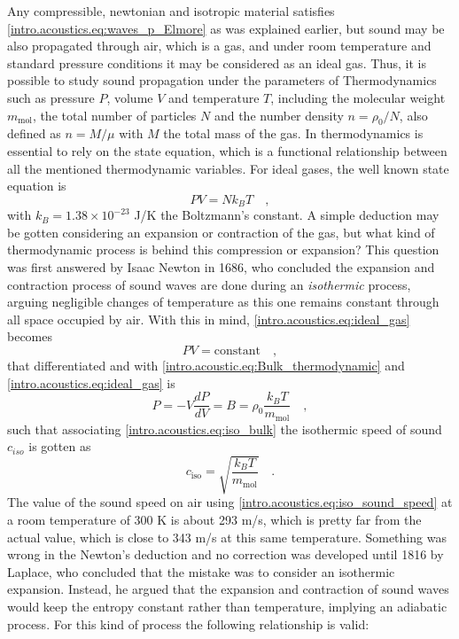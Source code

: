 Any compressible, newtonian and isotropic material satisfies \ref{intro.acoustics.eq:waves_p_Elmore} as was explained earlier, but sound may be also propagated through air, which is a gas, and under room temperature and standard pressure conditions it may be considered as an ideal gas. Thus, it is possible to study sound propagation under the parameters of Thermodynamics such as pressure $P$, volume $V$ and temperature $T$, including the molecular weight $m_{\text{mol}}$, the total number of particles $N$ and the number density $n = \rho_0/N$, also defined as $n = M/\mu$ with $M$ the total mass of the gas. In thermodynamics is essential to rely on the state equation, which is a functional relationship between all the mentioned thermodynamic variables. For ideal gases, the well known state equation is
\begin{equation}\label{intro.acoustics.eq:ideal_gas}
    PV = Nk_BT\quad,
\end{equation}
with $k_B = 1.38\times10^{-23}$ J/K the Boltzmann's constant. A simple deduction may be gotten considering an expansion or contraction of the gas, but what kind of thermodynamic process is behind this compression or expansion? This question was first answered by Isaac Newton in 1686, who concluded the expansion and contraction process of sound waves are done during an \textit{isothermic} process, arguing negligible changes of temperature as this one remains constant through all space occupied by air. With this in mind, \ref{intro.acoustics.eq:ideal_gas} becomes
\begin{equation}\label{intro.acoustics.eq:ideal_gas_iso}
    PV = \text{constant}\quad,
\end{equation}
that differentiated and with \ref{intro.acoustic.eq:Bulk_thermodynamic} and \ref{intro.acoustics.eq:ideal_gas} is
\begin{equation}\label{intro.acoustics.eq:iso_bulk}
P = - V\frac{dP}{dV} = B = \rho_0\frac{k_B T}{m_\text{mol}}\quad,
\end{equation}
such that associating \ref{intro.acoustics.eq:iso_bulk} the isothermic speed of sound $c_{iso}$ is gotten as
\begin{equation}\label{intro.acoustics.eq:iso_sound_speed}
    c_\text{iso} = \sqrt{\frac{k_B T}{m_\text{mol}}}\quad.
\end{equation}
The value of the sound speed on air using \ref{intro.acoustics.eq:iso_sound_speed} at a room temperature of 300 K is about 293 m/s, which is pretty far from the actual value, which is close to 343 m/s at this same temperature. Something was wrong in the Newton's deduction and no correction was developed until 1816 by Laplace, who concluded that the mistake was to consider an isothermic expansion. Instead, he argued that the expansion and contraction of sound waves would keep the entropy constant rather than temperature, implying an adiabatic process. For this kind of process the following relationship is valid:
